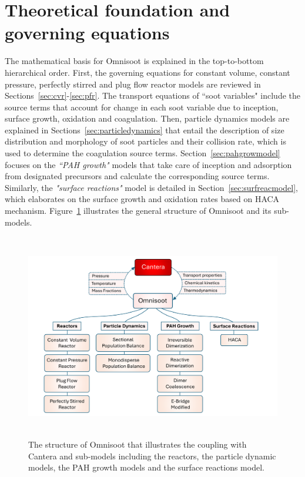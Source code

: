 \section{Theoretical foundation and governing equations}
The mathematical basis for Omnisoot is explained in the top-to-bottom hierarchical order. First, the governing equations for constant volume, constant pressure, perfectly stirred and plug flow reactor models are reviewed in Sections~\ref{sec:cvr}-\ref{sec:pfr}. The transport equations of ``soot variables" include the source terms that account for change in each soot variable due to inception, surface growth, oxidation and coagulation. Then, particle dynamics models are explained in Sections~\ref{sec:particledynamics} that entail the description of size distribution and morphology of soot particles and their collision rate, which is used to determine the coagulation source terms. Section~\ref{sec:pahgrowmodel} focuses on the \textit{``PAH growth"} models that take care of inception and adsorption from designated precursors and calculate the corresponding source terms. Similarly, the \textit{"surface reactions"} model is detailed in Section~\ref{sec:surfreacmodel}, which elaborates on the surface growth and oxidation rates based on HACA mechanism. Figure~\ref{fig:structure} illustrates the general structure of Omnisoot and its sub-models.

\begin{figure}[!htbp]
	\centering
	\includegraphics[height=90mm, ]{Figures/Theory/structure.pdf}
	\caption{The structure of Omnisoot that illustrates the coupling with Cantera and sub-models including the reactors, the particle dynamic models, the PAH growth models and the surface reactions model.}
	\label{fig:structure}
\end{figure}

